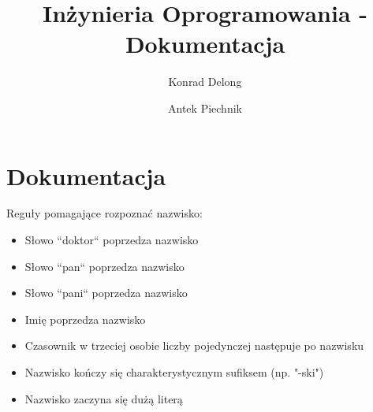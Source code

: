 \documentclass[12pt]{article}
\author{Konrad Delong \and Antek Piechnik}
\title{Inżynieria Oprogramowania - Dokumentacja}
\begin{document}
\maketitle
\tableofcontents
\newpage

\section{Dokumentacja}
Reguły pomagające rozpoznać nazwisko:
\begin{itemize}
\item Słowo ``doktor`` poprzedza nazwisko
\item Słowo ``pan`` poprzedza nazwisko
\item Słowo ``pani`` poprzedza nazwisko
\item Imię poprzedza nazwisko
\item Czasownik w trzeciej osobie liczby pojedynczej następuje po nazwisku
\item Nazwisko kończy się charakterystycznym sufiksem (np. "-ski")
\item Nazwisko zaczyna się dużą literą
\end{itemize}
\end{document}
